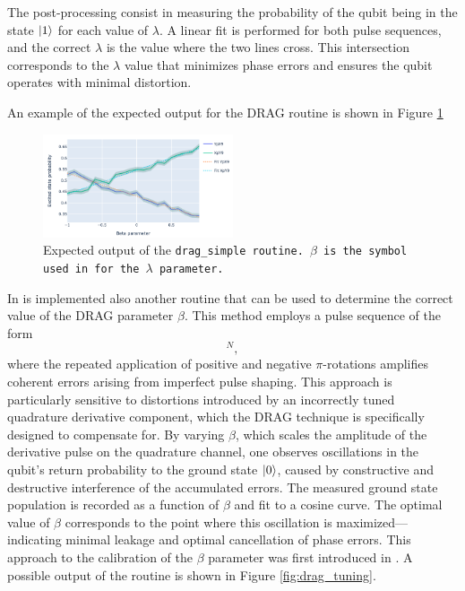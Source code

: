 The post-processing consist in measuring the probability of the qubit being in the state $\ket{1}$ for each value of $\lambda$. 
A linear fit is performed for both pulse sequences, and the correct $\lambda$ is the value where the two lines cross. 
This intersection corresponds to the $\lambda$ value that minimizes phase errors and ensures the qubit operates with minimal distortion.

An example of the expected output for the DRAG routine is shown in Figure \ref{fig:drag}
\begin{figure}[h!]
    \centering
    \includegraphics[width=0.5\textwidth]{figures/png/drag_simple.png}
    \caption{Expected output of the \tt{drag\_simple} routine. $\beta$ is the symbol used in \Qibocal for the $\lambda$ parameter.}
    \label{fig:drag}
\end{figure}

In \Qibocal is implemented also another routine that can be used to determine the correct value of the DRAG parameter $\beta$. This method employs a pulse sequence of the form
\begin{equation}
    [X_{\pi} - X_{-\pi}]^N,
\end{equation}
where the repeated application of positive and negative $\pi$-rotations amplifies coherent errors arising from imperfect pulse shaping. 
This approach is particularly sensitive to distortions introduced by an incorrectly tuned quadrature derivative component, which the DRAG technique is specifically designed to compensate for. 
By varying $\beta$, which scales the amplitude of the derivative pulse on the quadrature channel, one observes oscillations in the qubit's return probability to the ground state $\ket{0}$, caused by constructive and destructive interference of the accumulated errors.
The measured ground state population is recorded as a function of $\beta$ and fit to a cosine curve. 
The optimal value of $\beta$ corresponds to the point where this oscillation is maximized—indicating minimal leakage and optimal cancellation of phase errors. 
This approach to the calibration of the $\beta$ parameter was first introduced in \cite{DRAG2}. 
A possible output of the routine is shown in Figure \ref{fig:drag_tuning}.

